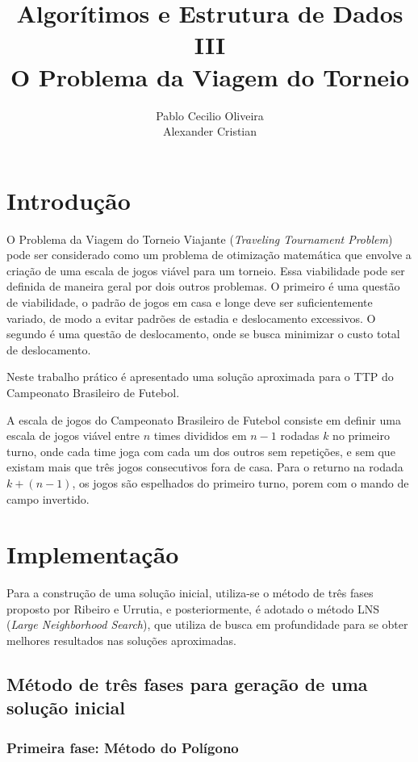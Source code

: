 \documentclass[12pt,a4paper]{article}
\author{Pablo Cecilio Oliveira\\
	Alexander Cristian}
\title{Algorítimos e Estrutura de Dados III\\
O Problema da Viagem do Torneio}
\date{}
\numberwithin{figure}{section}
\numberwithin{table}{section}
\begin{document}
\maketitle

\section{Introdução}

O Problema da Viagem do Torneio Viajante (\textit{Traveling Tournament Problem}) pode ser considerado como um problema de otimização matemática que envolve a criação de uma escala de jogos viável para um torneio. Essa viabilidade pode ser definida de maneira geral por dois outros problemas. O primeiro é uma questão de viabilidade, o padrão de jogos em casa e longe deve ser suficientemente variado, de modo a evitar padrões de estadia e deslocamento excessivos. O segundo é uma questão de deslocamento, onde se busca minimizar o custo total de deslocamento.

Neste trabalho prático é apresentado uma solução aproximada para o TTP do Campeonato Brasileiro de Futebol.

A escala de jogos do Campeonato Brasileiro de Futebol consiste em definir uma escala de jogos viável entre $n$ times divididos em $n-1$ rodadas $k$ no primeiro turno, onde cada time joga com cada um dos outros sem repetições, e sem que existam mais que três jogos consecutivos fora de casa. Para o returno na rodada $k + (n - 1)$, os jogos são espelhados do primeiro turno, porem com o mando de campo invertido.

\section{Implementação}

Para a construção de uma solução inicial, utiliza-se o método de três fases proposto por Ribeiro e Urrutia\cite{urrutia:heuristics}, e posteriormente, é adotado o método LNS (\textit{Large Neighborhood Search}), que utiliza de busca em profundidade para se obter melhores resultados nas soluções aproximadas.

\subsection{Método de três fases para geração de uma solução inicial}

\subsubsection{Primeira fase: Método do Polígono}
\label{subsec:primeirafase}
\end{document}
